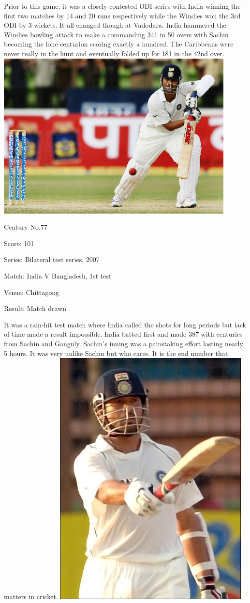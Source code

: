 \documentclass[11pt, a4paper]{article}
\begin{document}
Prior to this game, it was a closely contested ODI series with India winning the first two matches by 14 and 20 runs respectively while the Windies won the 3rd ODI by 3 wickets. It all changed though at Vadodara. India hammered the Windies bowling attack to make a commanding 341 in 50 overs with Sachin becoming the lone centurion scoring exactly a hundred. The Caribbeans were never really in the hunt and eventually folded up for 181 in the 42nd over.
\newpage
\includegraphics[width=0.9\textwidth]{pics/77.jpg}

Century No.77 

Score: 101 

Series: Bilateral test series, 2007 

Match: India V Bangladesh, 1st test 

Venue: Chittagong 

Result: Match drawn 

It was a rain-hit test match where India called the shots for long periods but lack of time made a result impossible. India batted first and made 387 with centuries from Sachin and Ganguly. Sachin's inning was a painstaking effort lasting nearly 5 hours. It was very unlike Sachin but who cares. It is the end number that matters in cricket.
\newpage
\includegraphics[height=0.75\textheight]{pics/78.jpg}
\end{document}

